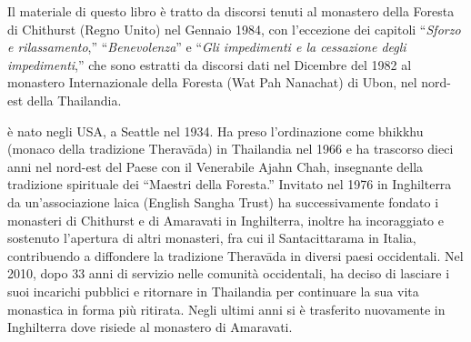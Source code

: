 
{\centering\par
\Large\scshape\chapTitleFont\thetitle
\par}
\vspace*{2\baselineskip}

{%
\setlength{\parskip}{1.5em}
\setlength{\parindent}{0pt}

Il materiale di questo libro è tratto da discorsi tenuti al monastero della Foresta di Chithurst (Regno Unito) nel Gennaio 1984, con l'eccezione dei capitoli ``\textit{Sforzo e rilassamento},'' ``\textit{Benevolenza}'' e ``\textit{Gli impedimenti e la cessazione degli impedimenti},'' che sono estratti da discorsi dati nel Dicembre del 1982 al monastero Internazionale della Foresta (Wat Pah Nanachat) di Ubon, nel nord-est della Thailandia.

%
%
%
%
%
%
%

\clearpage
\thispagestyle{empty}

{\scshape \theauthor} è nato negli USA, a Seattle nel 1934. Ha preso l'ordinazione come bhikkhu (monaco della tradizione Theravāda) in Thailandia nel 1966 e ha trascorso dieci anni nel nord-est del Paese con il Venerabile Ajahn Chah, insegnante della tradizione spirituale dei ``Maestri della Foresta.'' Invitato nel 1976 in Inghilterra da un'associazione laica (English Sangha Trust) ha successivamente fondato i monasteri di Chithurst e di Amaravati in Inghilterra, inoltre ha incoraggiato e sostenuto l'apertura di altri monasteri, fra cui il Santacittarama in Italia, contribuendo a diffondere la tradizione Theravāda in diversi paesi occidentali. Nel 2010, dopo 33 anni di servizio nelle comunità occidentali, ha deciso di lasciare i suoi incarichi pubblici e ritornare in Thailandia per continuare la sua vita monastica in forma più ritirata. Negli ultimi anni si è trasferito nuovamente in Inghilterra dove risiede al monastero di Amaravati.

}

